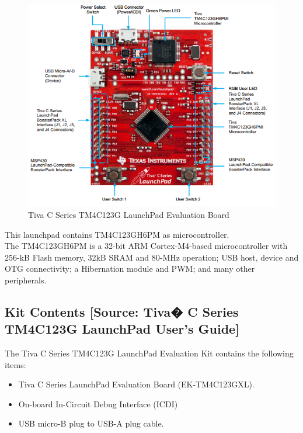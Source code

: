 \documentclass[a4paper,12pt,oneside]{book}
\begin{document}
\begin{figure}[h]
\centering
\includegraphics[scale=1]{board}
\caption{Tiva C Series TM4C123G LaunchPad Evaluation Board}
\end{figure}
This launchpad contains TM4C123GH6PM as microcontroller.\\
The TM4C123GH6PM is a 32-bit ARM Cortex-M4-based microcontroller with 256-kB Flash memory, 32\-kB SRAM and 80-MHz operation; USB host, device and OTG connectivity; a Hibernation module and PWM; and many other peripherals.
\newpage
\subsection{Kit Contents [Source: Tiva� C Series TM4C123G LaunchPad User's Guide]}
The Tiva C Series TM4C123G LaunchPad Evaluation Kit contains the following items:
\begin{itemize}
    \item Tiva C Series LaunchPad Evaluation Board (EK-TM4C123GXL).
    \item On-board In-Circuit Debug Interface (ICDI)
    \item USB micro-B plug to USB-A plug cable.

\end{itemize}
\end{document}
